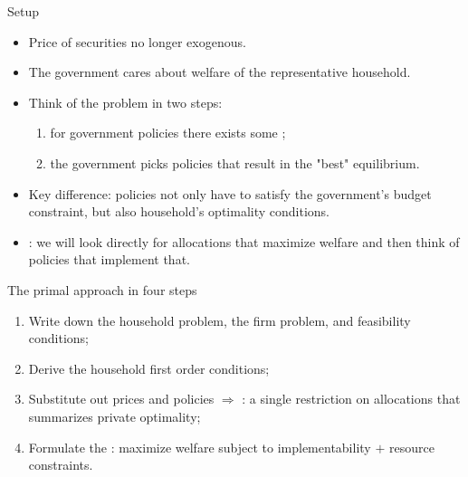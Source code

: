 \documentclass[11pt,xcolor={dvipsnames},aspectratio=159,hyperref={pdftex,pdfpagemode=UseNone,hidelinks,pdfdisplaydoctitle=true},usepdftitle=false]{beamer}
\begin{document}
        
            \begin{frame}{Setup}
            \begin{itemize}
            \item Price of securities no longer exogenous.
            \item The government cares about welfare of the representative household.
            \item Think of the problem in two steps:
            \begin{enumerate} 
                \item for  government policies there exists some ;
                \item the government picks policies that result in the "best" equilibrium.
            \end{enumerate}
            \item Key difference: policies not only have to satisfy the government's budget constraint, but also household's optimality conditions.
            \item {}: we will look directly for allocations that maximize welfare and then think of policies that implement that.
            \end{itemize}
            \end{frame}
	            \begin{frame}{The primal approach in four steps}
	            \begin{enumerate}
	                \item Write down the household problem, the firm problem, and feasibility conditions;
	                \item Derive the household first order conditions;
	                \item Substitute out prices and policies $\Rightarrow$ : a single restriction on allocations that summarizes private optimality;
	                \item Formulate the : maximize welfare subject to implementability $+$ resource constraints.
	            \end{enumerate}
	            \end{frame}
\end{document}
